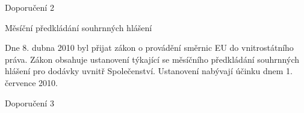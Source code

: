 \documentclass[10pt]{article}
\begin{document}
Doporučení 2



Měsíční předkládání souhrnných hlášení

Dne 8. dubna 2010 byl přijat zákon o provádění směrnic EU do vnitrostátního práva.
Zákon obsahuje ustanovení týkající se měsíčního předkládání souhrnných hlášení pro dodávky uvnitř Společenství.
Ustanovení nabývají účinku dnem 1. července 2010.


Doporučení 3
\end{document}
